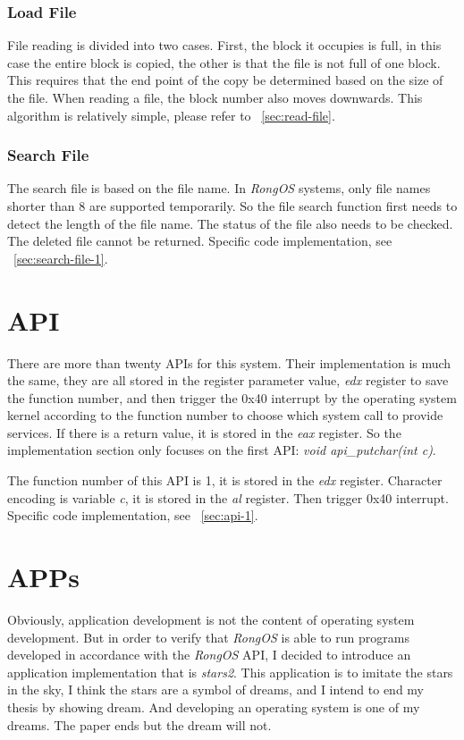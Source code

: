 \documentclass{swfcthesis}
\begin{document}
\subsubsection{Load File}
\label{sec:load-file}
File reading is divided into two cases. First, the block it occupies is full, in this case
the entire block is copied, the other is that the file is not full of one block. This
requires that the end point of the copy be determined based on the size of the file. When
reading a file, the block number also moves downwards. This algorithm is relatively
simple, please refer to ~\ref{sec:read-file}.

\subsubsection{Search File}
\label{sec:search-file}

The search file is based on the file name. In \emph{RongOS} systems, only file names
shorter than 8 are supported temporarily. So the file search function first needs to
detect the length of the file name. The status of the file also needs to be checked. The
deleted file cannot be returned. Specific code implementation, see ~\ref{sec:search-file-1}.


\section{API}
\label{sec:API}
There are more than twenty APIs for this system. Their implementation is much the same,
they are all stored in the register parameter value, \emph{edx} register to save the
function number, and then trigger the 0x40 interrupt by the operating system kernel
according to the function number to choose which system call to provide services. If there
is a return value, it is stored in the \emph{eax} register. So the implementation section
only focuses on the first API: \emph{void api\_putchar(int c)}.

The function number of this API is 1, it is stored in the \emph{edx} register. Character
encoding is variable \emph{c}, it is stored in the \emph{al} register. Then trigger 0x40
interrupt. Specific code implementation, see ~\ref{sec:api-1}.


\section{APPs}
\label{sec:apps}
Obviously, application development is not the content of operating system development. But
in order to verify that \emph{RongOS} is able to run programs developed in accordance with
the \emph{RongOS} API, I decided to introduce an application implementation that is
\emph{stars2}. This application is to imitate the stars in the sky, I think the stars are
a symbol of dreams, and I intend to end my thesis by showing dream. And developing an
operating system is one of my dreams. The paper ends but the dream will not.
\end{document}
